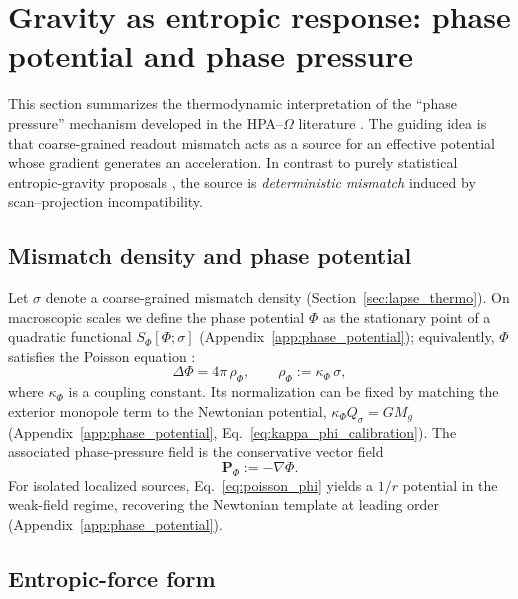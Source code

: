 \section{Gravity as entropic response: phase potential and phase pressure}
\label{sec:entropy_force_gravity}

This section summarizes the thermodynamic interpretation of the ``phase pressure'' mechanism developed in the HPA--$\Omega$ literature \cite{Ma2025HPD,Ma2025CAP}. The guiding idea is that coarse-grained readout mismatch acts as a source for an effective potential whose gradient generates an acceleration. In contrast to purely statistical entropic-gravity proposals \cite{Verlinde2011}, the source is \emph{deterministic mismatch} induced by scan--projection incompatibility.

\subsection{Mismatch density and phase potential}

Let $\sigma$ denote a coarse-grained mismatch density (Section~\ref{sec:lapse_thermo}). On macroscopic scales we define the phase potential $\Phi$ as the stationary point of a quadratic functional $S_\Phi[\Phi;\sigma]$ (Appendix~\ref{app:phase_potential}); equivalently, $\Phi$ satisfies the Poisson equation \cite{Jackson1998}:
\begin{equation}
\Delta \Phi = 4\pi\,\rho_\Phi,\qquad \rho_\Phi := \kappa_\Phi\,\sigma,
\label{eq:poisson_phi}
\end{equation}
where $\kappa_\Phi$ is a coupling constant. Its normalization can be fixed by matching the exterior monopole term to the Newtonian potential, $\kappa_\Phi Q_\sigma = G M_g$ (Appendix~\ref{app:phase_potential}, Eq.~\eqref{eq:kappa_phi_calibration}). The associated phase-pressure field is the conservative vector field
\begin{equation}
\mathbf{P}_\Phi := -\nabla\Phi.
\end{equation}
For isolated localized sources, Eq.~\eqref{eq:poisson_phi} yields a $1/r$ potential in the weak-field regime, recovering the Newtonian template at leading order (Appendix~\ref{app:phase_potential}).

\subsection{Entropic-force form}

